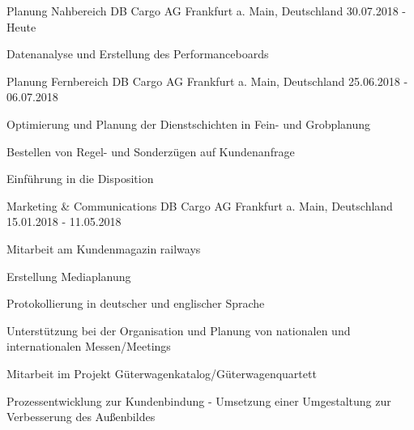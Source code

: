 

\begin{cventries}

  \cventry
    {Planung Nahbereich} %
    {DB Cargo AG} %
    {Frankfurt a. Main, Deutschland} %
    {30.07.2018 - Heute} %
    {
      \begin{cvitems} %
        \item {Datenanalyse und Erstellung des Performanceboards}
      \end{cvitems}
    }

  \cventry
    {Planung Fernbereich} %
    {DB Cargo AG} %
    {Frankfurt a. Main, Deutschland} %
    {25.06.2018 - 06.07.2018} %
    {
      \begin{cvitems} %
        \item {Optimierung und Planung der Dienstschichten in Fein- und Grobplanung}
        \item {Bestellen von Regel- und Sonderzügen auf Kundenanfrage}
        \item {Einführung in die Disposition}
      \end{cvitems}
    }

  \cventry
    {Marketing \& Communications} %
    {DB Cargo AG} %
    {Frankfurt a. Main, Deutschland} %
    {15.01.2018 - 11.05.2018} %
    {
      \begin{cvitems} %
        \item {Mitarbeit am Kundenmagazin {\glqq}railways{\grqq}}
        \item {Erstellung Mediaplanung}
        \item {Protokollierung in deutscher und englischer Sprache}
        \item {Unterstützung bei der Organisation und Planung von nationalen und internationalen Messen/Meetings}
        \item {Mitarbeit im Projekt {\glqq}Güterwagenkatalog/Güterwagenquartett{\grqq}}
        \item {Prozessentwicklung zur Kundenbindung - Umsetzung einer Umgestaltung zur Verbesserung des Außenbildes}
      \end{cvitems}
    }
    

\end{cventries}
